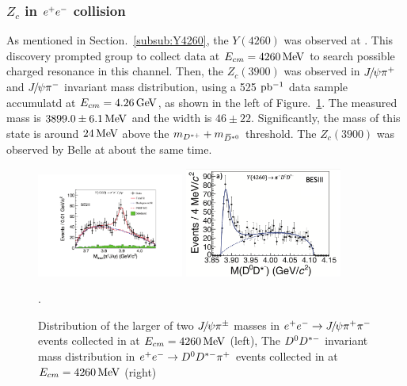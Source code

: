 \subsubsection{$Z_{c}$ in ${e^+}{e^-}$ collision}

As mentioned in Section.~\ref{subsub:Y4260},
the $Y(4260)$ was observed at \babar.
This discovery prompted \besiii group to collect data at $E_{cm}=4260 \text{\,Me\kern -0.1em V}$ to search possible charged resonance 
in this channel.
Then,
the $Z_{c}(3900)$ was observed in ${{J\mskip -3mu/\mskip -2mu\psi}}{{\pi}^+}$ and ${{J\mskip -3mu/\mskip -2mu\psi}}{{\pi}^-}$ invariant mass distribution, 
using a 525 $\rm{pb^{-1}}$ \besiii data sample accumulatd at $E_{cm}=4.26\text{\,Ge\kern -0.1em V}$\supercite{PhysRevLett.110.252001},
as shown in the left of Figure.~\ref{fig:3900}.
The measured mass is $3899.0\pm6.1 \text{\,Me\kern -0.1em V}$ and the width is $46\pm22$.
Significantly,
the mass of this state is around $24 \text{\,Me\kern -0.1em V}$ above the $m_{{{D}^{*+}}}+m_{{{\kern 0.18em\overline{\kern -0.18em D}}{}^{*0}}}$ threshold.
The $Z_{c}(3900)$ was observed by Belle at about the same time\supercite{PhysRevLett.110.252002}.

\begin{figure}[!hbtp]
\centering
   \includegraphics[width=0.43\textwidth]{Figures/01_Introduction/Exotic/charged_particle/bes3_zc3900} %
   \includegraphics[width=0.46\textwidth]{Figures/01_Introduction/Exotic/charged_particle/bes3_Z3900_DD} %
   \caption{ 
   Distribution of the larger of two ${{J\mskip -3mu/\mskip -2mu\psi}}\pi^{\pm}$ masses in ${e^+}{e^-}\rightarrow{\ensuremath{{J\mskip -3mu/\mskip -2mu\psi}}}{\ensuremath{{\pi}^+}}{\ensuremath{{\pi}^-}}$ events collected in \besiii
   at $E_{cm}=4260 \text{\,Me\kern -0.1em V}$\supercite{PhysRevLett.110.252001} (left),
   The ${{D}^0}{{D}^{*-}}$ invariant mass distribution in ${e^+}{e^-}\rightarrow{\ensuremath{{D}^0}}{\ensuremath{{D}^{*-}}}{\ensuremath{{\pi}^+}}$ events collected in \besiii at $E_{cm}=4260 \text{\,Me\kern -0.1em V}$
   \supercite{PhysRevLett.112.022001} (right)}.
\label{fig:3900}
\end{figure}

